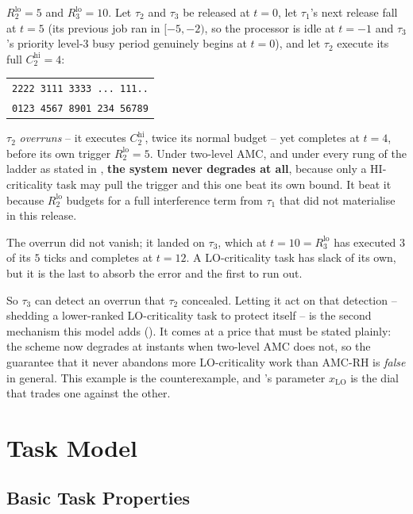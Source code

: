 \documentclass{article}
\begin{document}
\noindent $R_2^{\mathrm{lo}} = 5$ and $R_3^{\mathrm{lo}} = 10$. Let $\tau_2$
and $\tau_3$ be released at $t = 0$, let $\tau_1$'s next release fall at
$t = 5$ (its previous job ran in $[-5, -2)$, so the processor is idle at
$t = -1$ and $\tau_3$'s priority level-3 busy period genuinely begins at
$t = 0$), and let $\tau_2$ execute its full $C_2^{\mathrm{hi}} = 4$:

\begin{center}
\begin{tabular}{l}
\toprule
\texttt{2222~3111~3333~...~111..} \\
\texttt{0123~4567~8901~234~56789} \\
\bottomrule
\end{tabular}
\end{center}

\noindent $\tau_2$ \emph{overruns} -- it executes $C_2^{\mathrm{hi}}$, twice its
normal budget -- yet completes at $t = 4$, before its own trigger
$R_2^{\mathrm{lo}} = 5$. Under two-level AMC, and under every rung of the
ladder as stated in , \textbf{the system never degrades at
all}, because only a HI-criticality task may pull the trigger and this one beat
its own bound. It beat it because $R_2^{\mathrm{lo}}$ budgets for a full
interference term from $\tau_1$ that did not materialise in this release.

The overrun did not vanish; it landed on $\tau_3$, which at $t = 10 =
R_3^{\mathrm{lo}}$ has executed $3$ of its $5$ ticks and completes at $t = 12$.
A LO-criticality task has slack of its own, but it is the last to absorb the
error and the first to run out.

So $\tau_3$ can detect an overrun that $\tau_2$ concealed. Letting it act on
that detection -- shedding a lower-ranked LO-criticality task to protect
itself -- is the second mechanism this model adds (). It
comes at a price that must be stated plainly: the scheme now degrades at
instants when two-level AMC does not, so the guarantee that it never abandons
more LO-criticality work than AMC-RH is \emph{false} in general. This example
is the counterexample, and 's parameter $x_{\mathrm{LO}}$
is the dial that trades one against the other.

\section{Task Model}

\subsection{Basic Task Properties}
\end{document}
